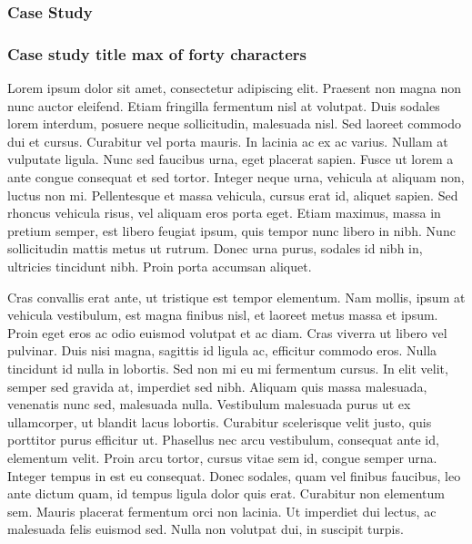 \documentclass[
]{book}
\begin{document}
\hypertarget{case-study}{%
\subsubsection*{Case Study}\label{case-study}}

\hypertarget{box-text}{%
\subsubsection*{Case study title max of forty characters}\label{box-text}}

Lorem ipsum dolor sit amet, consectetur adipiscing elit. Praesent non magna non nunc auctor eleifend. Etiam fringilla fermentum nisl at volutpat. Duis sodales lorem interdum, posuere neque sollicitudin, malesuada nisl. Sed laoreet commodo dui et cursus. Curabitur vel porta mauris. In lacinia ac ex ac varius. Nullam at vulputate ligula. Nunc sed faucibus urna, eget placerat sapien. Fusce ut lorem a ante congue consequat et sed tortor. Integer neque urna, vehicula at aliquam non, luctus non mi. Pellentesque et massa vehicula, cursus erat id, aliquet sapien. Sed rhoncus vehicula risus, vel aliquam eros porta eget. Etiam maximus, massa in pretium semper, est libero feugiat ipsum, quis tempor nunc libero in nibh. Nunc sollicitudin mattis metus ut rutrum. Donec urna purus, sodales id nibh in, ultricies tincidunt nibh. Proin porta accumsan aliquet.

Cras convallis erat ante, ut tristique est tempor elementum. Nam mollis, ipsum at vehicula vestibulum, est magna finibus nisl, et laoreet metus massa et ipsum. Proin eget eros ac odio euismod volutpat et ac diam. Cras viverra ut libero vel pulvinar. Duis nisi magna, sagittis id ligula ac, efficitur commodo eros. Nulla tincidunt id nulla in lobortis. Sed non mi eu mi fermentum cursus. In elit velit, semper sed gravida at, imperdiet sed nibh. Aliquam quis massa malesuada, venenatis nunc sed, malesuada nulla. Vestibulum malesuada purus ut ex ullamcorper, ut blandit lacus lobortis. Curabitur scelerisque velit justo, quis porttitor purus efficitur ut. Phasellus nec arcu vestibulum, consequat ante id, elementum velit. Proin arcu tortor, cursus vitae sem id, congue semper urna. Integer tempus in est eu consequat. Donec sodales, quam vel finibus faucibus, leo ante dictum quam, id tempus ligula dolor quis erat. Curabitur non elementum sem. Mauris placerat fermentum orci non lacinia. Ut imperdiet dui lectus, ac malesuada felis euismod sed. Nulla non volutpat dui, in suscipit turpis.
\end{document}
